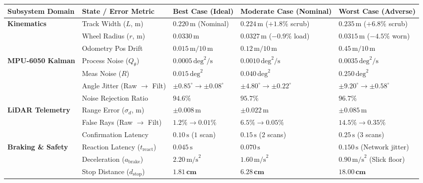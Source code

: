 \documentclass[11pt, a4paper]{article}
\begin{document}
\begin{table}[H]
\centering
\small
\begin{tabularx}{\textwidth}{L{3.2cm} L{3.0cm} Y Y Y}
\toprule
\textbf{Subsystem Domain} & \textbf{State / Error Metric} & \textbf{Best Case (Ideal)} & \textbf{Moderate Case (Nominal)} & \textbf{Worst Case (Adverse)} \\
\midrule
\textbf{Kinematics} & Track Width ($L$, m) & $0.220\,\text{m}$ (Nominal) & $0.224\,\text{m}$ ($+1.8\%$ scrub) & $0.235\,\text{m}$ ($+6.8\%$ scrub) \\
& Wheel Radius ($r$, m) & $0.0330\,\text{m}$ & $0.0327\,\text{m}$ ($-0.9\%$ load) & $0.0315\,\text{m}$ ($-4.5\%$ worn) \\
& Odometry Pos Drift & $0.015\,\text{m} / 10\,\text{m}$ & $0.12\,\text{m} / 10\,\text{m}$ & $0.45\,\text{m} / 10\,\text{m}$ \\
\midrule
\textbf{MPU-6050 Kalman} & Process Noise ($Q_\theta$) & $0.0005\,\text{deg}^2/\text{s}$ & $0.0010\,\text{deg}^2/\text{s}$ & $0.0035\,\text{deg}^2/\text{s}$ \\
& Meas Noise ($R$) & $0.015\,\text{deg}^2$ & $0.040\,\text{deg}^2$ & $0.250\,\text{deg}^2$ \\
& Angle Jitter (Raw $\to$ Filt) & $\pm 0.85^\circ \to \mathbf{\pm 0.08^\circ}$ & $\pm 4.80^\circ \to \mathbf{\pm 0.22^\circ}$ & $\pm 9.20^\circ \to \mathbf{\pm 0.58^\circ}$ \\
& Noise Rejection Ratio & $\mathbf{94.6\%}$ & $\mathbf{95.7\%}$ & $\mathbf{96.7\%}$ \\
\midrule
\textbf{LiDAR Telemetry} & Range Error ($\sigma_d$, m) & $\pm 0.008\,\text{m}$ & $\pm 0.022\,\text{m}$ & $\pm 0.085\,\text{m}$ \\
& False Rays (Raw $\to$ Filt) & $1.2\% \to \mathbf{0.01\%}$ & $6.5\% \to \mathbf{0.05\%}$ & $14.5\% \to \mathbf{0.35\%}$ \\
& Confirmation Latency & $0.10\,\text{s}$ ($1$ scan) & $0.15\,\text{s}$ ($2$ scans) & $0.25\,\text{s}$ ($3$ scans) \\
\midrule
\textbf{Braking \& Safety} & Reaction Latency ($t_{\text{react}}$) & $0.045\,\text{s}$ & $0.070\,\text{s}$ & $0.150\,\text{s}$ (Network jitter) \\
& Deceleration ($a_{\text{brake}}$) & $2.20\,\text{m/s}^2$ & $1.60\,\text{m/s}^2$ & $0.90\,\text{m/s}^2$ (Slick floor) \\
& Stop Distance ($d_{\text{stop}}$) & $\mathbf{1.81\,\text{cm}}$ & $\mathbf{6.28\,\text{cm}}$ & $\mathbf{18.00\,\text{cm}}$ \\

\end{tabularx}
\end{table}
\end{document}

